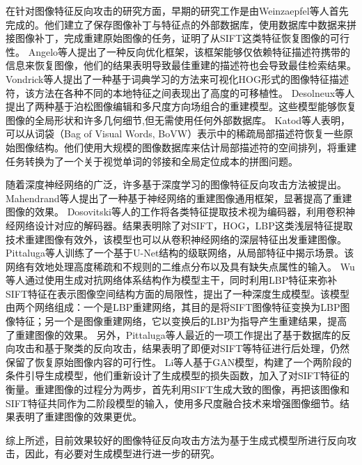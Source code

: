 在针对图像特征反向攻击的研究方面，早期的研究工作是由Weinzaepfel\cite{5995616}等人首先完成的。他们建立了保存图像补丁与特征点的外部数据库，使用数据库中数据来拼接图像补丁，完成重建原始图像的任务，证明了从SIFT这类特征恢复图像的可行性。
Angelo\cite{6460288}等人提出了一种反向优化框架，该框架能够仅依赖特征描述符携带的信息来恢复图像，他们的结果表明导致最佳重建的描述符也会导致最佳检索结果。
Vondrick\cite{Vondrick_2013_ICCV}等人提出了一种基于词典学习的方法来可视化HOG形式的图像特征描述符，该方法在各种不同的本地特征之间表现出了高度的可移植性。
Desolneux\cite{10.1007/978-3-319-58771-4_11}等人提出了两种基于泊松图像编辑和多尺度方向场组合的重建模型。这些模型能够恢复图像的全局形状和许多几何细节,但无需使用任何外部数据库。
Katod\cite{Kato_2014_CVPR}等人表明，可以从词袋（Bag of Visual Words, BoVW）表示中的稀疏局部描述符恢复一些原始图像结构。他们使用大规模的图像数据库来估计局部描述符的空间排列，将重建任务转换为了一个关于视觉单词的邻接和全局定位成本的拼图问题。
\par
随着深度神经网络的广泛，许多基于深度学习的图像特征反向攻击方法被提出。
Mahendrand\cite{Mahendran_2015_CVPR}等人提出了一种基于神经网络的重建图像通用框架，显著提高了重建图像的效果。
Dosovitski\cite{Dosovitskiy_2016_CVPR}等人的工作将各类特征提取技术视为编码器，利用卷积神经网络设计对应的解码器。结果表明除了对SIFT，HOG，LBP这类浅层特征提取技术重建图像有效外，该模型也可以从卷积神经网络的深层特征出发重建图像。
Pittaluga\cite{Pittaluga_2019_CVPR}等人训练了一个基于U-Net结构的级联网络，从局部特征中揭示场景。该网络有效地处理高度稀疏和不规则的二维点分布以及具有缺失点属性的输入。
Wu\cite{9393327}等人通过使用生成对抗网络体系结构作为模型主干，同时利用LBP特征来弥补SIFT特征在表示图像空间结构方面的局限性，提出了一种深度生成模型。该模型由两个网络组成：一个是LBP重建网络，其目的是将SIFT图像特征变换为LBP图像特征；另一个是图像重建网络，它以变换后的LBP为指导产生重建结果，提高了重建图像的效果。
另外，Pittaluga\cite{Pittaluga_2023_ICCV}等人最近的一项工作提出了基于数据库的反向攻击和基于聚类的反向攻击，结果表明了即便对SIFT等特征进行后处理，仍然保留了恢复原始图像内容的可行性。
Li\cite{liDeepReverseAttack2024}等人基于GAN模型，构建了一个两阶段的条件引导生成模型，他们重新设计了生成模型的损失函数，加入了对SIFT特征的衡量。重建图像的过程分为两步，首先利用SIFT生成大致的图像，再把该图像和SIFT特征共同作为二阶段模型的输入，使用多尺度融合技术来增强图像细节。结果表明了重建图像的效果更优。
\par
综上所述，目前效果较好的图像特征反向攻击方法为基于生成式模型所进行反向攻击，因此，有必要对生成模型进行进一步的研究。
